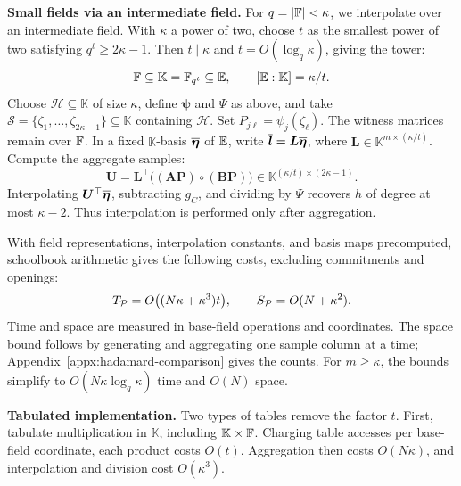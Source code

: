 \smallskip\noindent\textbf{Small fields via an intermediate field.}
For \(q=|{\mathbb{F}}|<\kappa\), we interpolate over an intermediate
field. With \(\kappa\) a power of two, choose \(t\)
as the smallest power of two satisfying \(q^t\geq2\kappa-1\).
Then \(t\mid\kappa\) and \(t=O(\log_q\kappa)\), giving the tower:
\[
    {\mathbb{F}}\subseteq\mathbb K=\mathbb F_{q^t}
    \subseteq\mathbb{E},
    \qquad [\mathbb{E}:\mathbb K]=\kappa/t.
\]
Choose \(\mathcal H\subseteq\mathbb K\) of size \(\kappa\),
define \(\bm\psi\) and \(\Psi\) as above, and take
\(\mathcal S=\{\zeta_1,\ldots,\zeta_{2\kappa-1}\}\subseteq\mathbb K\)
containing \(\mathcal H\).
Set \(P_{j\ell}=\psi_j(\zeta_\ell)\).
The witness matrices remain over \({\mathbb{F}}\).
In a fixed \(\mathbb K\)-basis \(\overline{\bm\eta}\) of
\(\mathbb{E}\), write \(\overline{\bm l}=\bm L\overline{\bm\eta}\),
where \(\bm L\in\mathbb K^{m\times(\kappa/t)}\).
Compute the aggregate samples:
\begin{equation}
    \bm U
    =\bm L^\top\bigl((\bm A\bm P)\circ(\bm B\bm P)\bigr)
    \in\mathbb K^{(\kappa/t)\times(2\kappa-1)}.
\label{eq:hadamard-small-field-aggregation}
\end{equation}
Interpolating \(\bm U^\top\overline{\bm\eta}\), subtracting \(g_C\),
and dividing by \(\Psi\) recovers \(h\) of degree at most
\(\kappa-2\). Thus interpolation is performed only after aggregation.

With field representations, interpolation constants, and basis
maps precomputed, schoolbook arithmetic gives the following
costs, excluding commitments and openings:
\begin{equation}
    T_{\mathcal{P}}=O\bigl((N\kappa+\kappa^3)t\bigr),
    \qquad S_{\mathcal{P}}=O(N+\kappa^2).
\label{eq:hadamard-small-field-cost}
\end{equation}
Time and space are measured in base-field operations and coordinates.
The space bound follows by generating and aggregating one sample
column at a time; Appendix~\ref{appx:hadamard-comparison} gives
the counts. For \(m\geq\kappa\), the bounds simplify to
\(O(N\kappa\log_q\kappa)\) time and \(O(N)\) space.

\smallskip\noindent\textbf{Tabulated implementation.}
Two types of tables remove the factor \(t\).
First, tabulate multiplication in \(\mathbb K\), including
\(\mathbb K\times{\mathbb{F}}\).
Charging table accesses per base-field coordinate, each product
costs \(O(t)\). Aggregation then costs \(O(N\kappa)\), and
interpolation and division cost \(O(\kappa^3)\).

